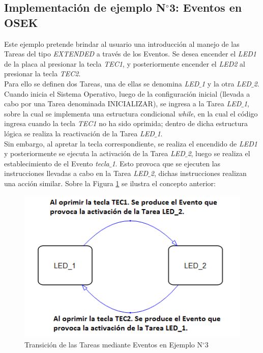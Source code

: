 \documentclass[12pt,letterpaper]{article}
\begin{document}
\subsection{Implementación de ejemplo N$^{\circ}$3: Eventos en OSEK}
Este ejemplo pretende brindar al usuario una introducción al manejo de las Tareas del tipo \textit{EXTENDED} a través de los Eventos. Se desea encender el \textit{LED1} de la placa al presionar la tecla \textit{TEC1}, y posteriormente encender el \textit{LED2} al presionar la tecla \textit{TEC2}.
 \\
 
Para ello se definen dos Tareas, una de ellas se denomina \textit{LED$\_$1} y la otra \textit{LED$\_$2}. Cuando inicia el Sistema Operativo, luego de la configuración inicial (llevada a cabo por una Tarea denominada INICIALIZAR), se ingresa a la Tarea \textit{LED$\_$1}, sobre la cual se implementa una estructura condicional \textit{while}, en la cual el código ingresa cuando la tecla \textit{TEC1} no ha sido oprimida; dentro de dicha estructura lógica se realiza la reactivación de la Tarea \textit{LED$\_$1}.
 \\
 
Sin embargo, al apretar la tecla correspondiente, se realiza el encendido de \textit{LED1} y posteriormente se ejecuta la activación de la Tarea \textit{LED$\_$2}, luego se realiza el establecimiento de el Evento \textit{tecla$\_$1}. Esto provoca que se ejecuten las instrucciones llevadas a cabo en la Tarea \textit{LED$\_$2}, dichas instrucciones realizan una acción similar. Sobre la Figura \ref{ejemplo3} se ilustra el concepto anterior:

\begin{figure}[H]
\centering
\includegraphics[width=10 cm]{figuras/f26.png}
\caption{Transición de las Tareas mediante Eventos en Ejemplo N$^{\circ}$3}
\label{ejemplo3}
\end{figure}
\end{document}
